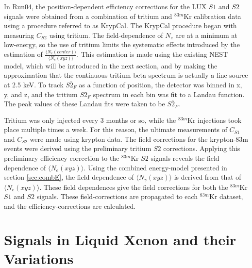 In Run04, the position-dependent efficiency corrections for the LUX $S1$ and $S2$ signals were obtained from a combination of tritium and $^{83m}$Kr calibration data using a procedure referred to as KrypCal\cite{richard}. The KrypCal procedure began with measuring  $C_{S2}$ using tritium. The field-dependence of $N_{e}$ are at a minimum at low-energy, so the use of tritium limits the systematic effects introduced by the estimation of $\frac{\langle N_{e}(center)\rangle}{\langle N_{e}(xyz)\rangle}$. This estimation is made using the existing NEST model, which will be introduced in the next section, and by making the approximation that the continuous tritium beta spectrum is actually a line source at 2.5 keV. To track $\overline{S2_F}$ as a function of position, the detector was binned in x, y, and z, and the tritium $S2_F$ spectrum in each bin was fit to a Landau function. The peak values of these Landau fits were taken to be $\overline{S2_F}$.

Tritium was only injected every 3 months or so, while the $^{83m}$Kr injections took place multiple times a week. For this reason, the ultimate measurements of $C_{S1}$ and $C_{S2}$ were made using krypton data. The field corrections for the krypton-83m events were derived using the preliminary tritium $S2$ corrections. Applying this preliminary efficiency correction to the $^{83m}$Kr $S2$ signals reveals the field dependence of $\langle N_{e}(xyz)\rangle$. Using the combined energy-model presented in section \ref{sec:combE}, the field dependence of $\langle N_{\gamma}(xyz)\rangle$ is derived from that of $\langle N_{e}(xyz)\rangle$. These field dependences give the field corrections for both the $^{83m}$Kr $S1$ and $S2$ signals. These field-corrections are propagated to each $^{83m}$Kr dataset, and the efficiency-corrections are calculated.

\section{Signals in Liquid Xenon and their Variations}
